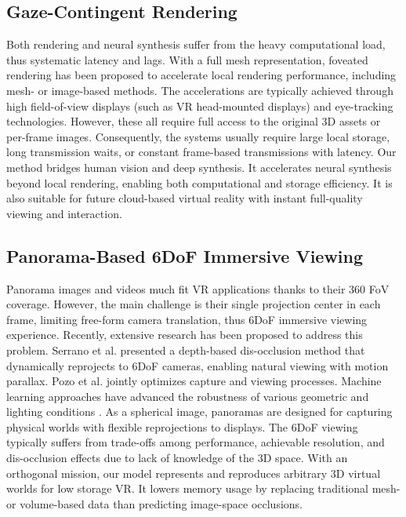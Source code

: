 \subsection{Gaze-Contingent Rendering}
Both rendering and neural synthesis suffer from the heavy computational load, thus systematic latency and lags.
With a full mesh representation, foveated rendering has been proposed to accelerate local rendering performance, including mesh- \cite{Guenter:2012:F3G,Patney:2016:TFR} or image-based \cite{Sun:2017:PGF,Kaplanyan:2019:DNR} methods. The accelerations are typically achieved through high field-of-view displays (such as VR head-mounted displays) and eye-tracking technologies. However, these all require full access to the original 3D assets or per-frame images. Consequently, the systems usually require large local storage, long transmission waits, or constant frame-based transmissions with latency. 
Our method bridges human vision and deep synthesis. It accelerates neural synthesis beyond local rendering, enabling both computational and storage efficiency. It is also suitable for future cloud-based virtual reality with instant full-quality viewing and interaction.

\subsection{Panorama-Based 6DoF Immersive Viewing}
Panorama images and videos much fit VR applications thanks to their 360 FoV coverage. However, the main challenge is their single projection center in each frame, limiting free-form camera translation, thus 6DoF immersive viewing experience. 
Recently, extensive research has been proposed to address this problem. Serrano et al.  presented a depth-based dis-occlusion method that dynamically reprojects to 6DoF cameras, enabling natural viewing with motion parallax. Pozo et al.  jointly optimizes capture and viewing processes.
Machine learning approaches have advanced the robustness of various geometric and lighting conditions \cite{Attal:2020:ECCV,Lin:DeepPanorama,Benjamin:2020:RTV}. 
As a spherical image, panoramas are designed for capturing physical worlds with flexible reprojections to displays. The 6DoF viewing typically suffers from trade-offs among performance, achievable resolution, and dis-occlusion effects due to lack of knowledge of the 3D space.
With an orthogonal mission, our model represents and reproduces arbitrary 3D virtual worlds for low storage VR. It lowers memory usage by replacing traditional mesh- or volume-based data than predicting image-space occlusions.